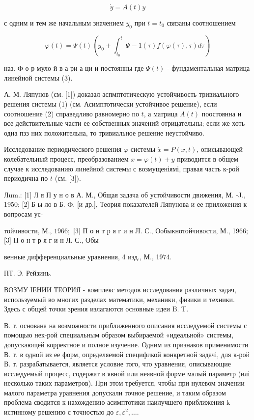 \documentclass[10pt]{article}
\begin{document}
\[

\dot{y}=A(t) y

\]



с одним и тем же начальным значением $y_{0}$ при $t=t_{0}$ связаны соотношением



\[

\varphi(t)=\Psi(t)\left(y_{0}+\int_{t_{0}}^{t} \Psi-1(\tau) f(\varphi(\tau), \tau) d \tau\right)

\]



наз. Ф о р муло й в а ри а ци и постоянны где $\Psi(t)$ - фундаментальная матрица линейной системы (3).



А. М. Ляпунов (см. [1]) доказал аспмптотическую устойчивость тривиального решения системы (1) (см. Асимптотически устойчивое решение), если соотношение (2) справедливо равномерно по $t$, а матрица $A(t)$ поостоянна и все действительные части ее собственных значений отрицательны; если же хоть одна пзз них положительна, то тривиальное решение неустойчиво.



Исследование периодического решения $\varphi$ системы $\dot{x}=P(x, t)$, описывающей колебательный процесс, преобразованием $x=\varphi(t)+y$ приводится в общем случае к исследованию линейной системы с возмущеніямі, правая часть к-рой периодична по $t$ (см. [3]).



Лum.: [1] Л я П у н о в А. М., Общая задача об устойчивости движения, М. -J., 1950; [2] Б ы ло в Б. Ф. [и др.], Теория показателей Ляпунова и ее приложения к вопросам ус-

тойчивости, М., $1966 ;$ [3] П о н т р я г и н ЈI. С., Ообыкнотойчивости, М., 1966; [3] П о н т р я г и н Л. С., Обы

венные дифференциальные уравнения, 4 изд., М., 1974.



ПТ. Э. Рейзинь.



ВОЗМУ ІЕНИИ ТЕОРИЯ - комплекс методов исследования различных задач, используемый во многих разделах математики, механики, физики и техники. Здесь с общей точки зрения излагаются основные идеи B. T.



В. т. основана на возможности приближенного описания исследуемой системы с помощью нек-рой специальным образом выбираемой «идеальной» системы, допускающей корректное и полное изучение. Одним из признаков применимости В. т. в одной из ее форм, определяемой спецификой конкретной задачі, для к-рой В. т. разрабатывается, является условие того, что уравнения, описывающие исследуемый процесс, содержат в явной или неявной форме малый параметр (илі несколько таких параметров). При этом требуется, чтобы при нулевом значении малого параметра уравнения допускали точное решение, и таким образом проблема сводится к нахождению асимптотики наилучшего приближения $\mathrm{k}$ истинному решению с точностью до $\varepsilon, \varepsilon^{2}, \ldots$.
\end{document}
